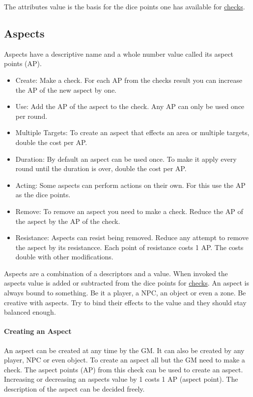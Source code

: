 \documentclass[11pt]{article}
\begin{document}
{The attributes value is the basis for the dice points one has available for \hyperref[sec:org79b32ad]{checks}. 
\subsection{Aspects}
\label{sec:org514182e}
\begin{short}
Aspects have a descriptive name and a whole number value called its aspect points (AP).
\begin{itemize}
\item Create: Make a check. For each AP from the checks result you can increase the AP of the new aspect by one.
\item Use: Add the AP of the aspect to the check. Any AP can only be used once per round.
\item Multiple Targets: To create an aspect that effects an area or multiple targets, double the cost per AP.
\item Duration: By default an aspect can be used once. To make it apply every round until the duration is over, double the cost per AP.
\item Acting: Some aspects can perform actions on their own. For this use the AP as the dice points.
\item Remove: To remove an aspect you need to make a check. Reduce the AP of the aspect by the AP of the check.
\item Resistance: Aspects can resist being removed. Reduce any attempt to remove the aspect by its resistancce. Each point of resistance costs 1 AP. The costs double with other modifications.
\end{itemize}
\end{short}

Aspects are a combination of a descriptors and a value. When invoked the aspects value is added or subtracted from the dice points  for \hyperref[sec:org79b32ad]{checks}. An aspect is always bound to something. Be it a player, a NPC, an object or even a zone. Be creative with aspects. Try to bind their effects to the value and they should stay balanced enough.
\paragraph*{Creating an Aspect}
\label{sec:org045c64a}

An aspect can be created at any time by the GM. It can also be created by any player, NPC or even object. To create an aspect all but the GM need to make a check. The aspect points (AP) from this check can be used to create an aspect. Increasing or decreasing an aspects value by 1 costs 1 AP (aspect point). The description of the aspect can be decided freely. 

}
\end{document}
